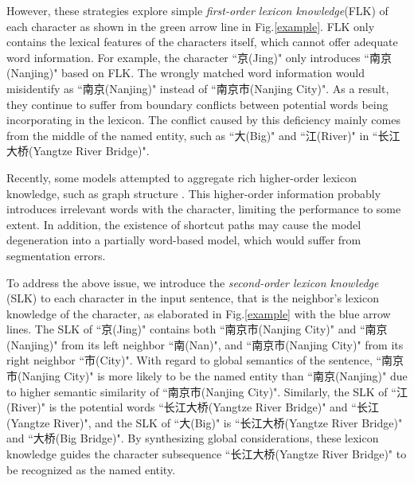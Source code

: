 \documentclass[conference]{IEEEtran}
\begin{document}
\begin{CJK*}{UTF8}{gbsn}
However, these strategies explore simple \textit{first-order lexicon knowledge}(FLK) of each character
as shown in the green arrow line in Fig.\ref{example}. 
FLK only contains the lexical features of the characters itself,
which cannot offer adequate word information.
For example, the character ``京(Jing)" only introduces ``南京(Nanjing)" based on FLK.
The wrongly matched word information would misidentify as ``南京(Nanjing)" instead of ``南京市(Nanjing City)". 
As a result, they continue to suffer from boundary conflicts between 
potential words being incorporating in the lexicon.
The conflict caused by this deficiency mainly comes from the middle of the named entity,
such as ``大(Big)" and ``江(River)" in ``长江大桥(Yangtze River Bridge)". 
\end{CJK*}

Recently, some models attempted to aggregate rich higher-order lexicon knowledge, such as 
graph structure \cite{gui2019lexicon,sui2019leverage,ding2019neural}.
This higher-order information probably introduces irrelevant words with the character, limiting the performance to some extent.
In addition, the existence of shortcut paths may cause the model degeneration into a partially word-based model,
 which would suffer from segmentation errors.  


















\begin{CJK*}{UTF8}{gbsn}
To address the above issue, 
we introduce the \textit{second-order lexicon knowledge} (SLK) to each character in the input sentence,
that is the neighbor's lexicon knowledge of the character, 
as elaborated in Fig.\ref{example} with the blue arrow lines.
The SLK of ``京(Jing)" contains both ``南京市(Nanjing City)" and ``南京(Nanjing)" from its left neighbor ``南(Nan)", 
and ``南京市(Nanjing City)" from its right neighbor ``市(City)".
With regard to global semantics of the sentence,
``南京市(Nanjing City)" is more likely to be the named entity than ``南京(Nanjing)" 
due to higher semantic similarity of ``南京市(Nanjing City)". 
Similarly, the SLK of ``江(River)" is the potential words ``长江大桥(Yangtze River Bridge)" and ``长江(Yangtze River)",
and the SLK of ``大(Big)" is ``长江大桥(Yangtze River Bridge)" and ``大桥(Big Bridge)".
By synthesizing global considerations, these lexicon knowledge guides 
the character subsequence ``长江大桥(Yangtze River Bridge)" to be recognized as the named entity.  
\end{CJK*}
\end{document}
